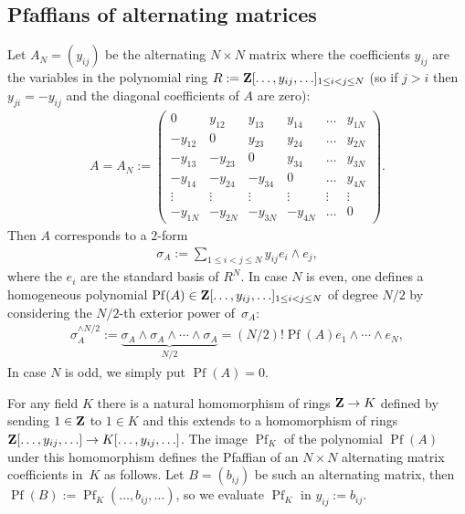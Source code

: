 \documentclass[pdftex]{sigma}
\newcommand{\ZZ}{{\bf Z}}
\numberwithin{equation}{section}
\begin{document}
\subsection{Pfaffians of alternating matrices} \label{Pfaff}
Let $A_N=(y_{ij})$ be the alternating $N\times N$ matrix where the coefficients $y_{ij}$ are the variables in the polynomial ring $R:=\ZZ[\ldots,y_{ij},\ldots]_{1\leq i<j\leq N}$
(so if $j>i$ then $y_{ji}=-y_{ij}$ and the diagonal coefficients of $A$ are zero):
\begin{gather*}
A = A_N :=\left(\begin{matrix}
0&y_{12}&y_{13}&y_{14}&\ldots&y_{1N}\\
-y_{12}&0&y_{23}&y_{24}&\ldots&y_{2N}\\
-y_{13}&-y_{23}&0&y_{34}&\ldots&y_{3N}\\
-y_{14}&-y_{24}&-y_{34}&0&\ldots&y_{4N}\\
\vdots&\vdots&\vdots&\vdots&\vdots&\vdots\\
-y_{1N}&-y_{2N}&-y_{3N}&-y_{4N}&\ldots&0
\end{matrix}\right).
\end{gather*}
Then $A$ corresponds to a $2$-form
\begin{gather*}
\sigma_A := \sum_{1\leq i<j\leq N} y_{ij}e_i\wedge e_j,
\end{gather*}
where the $e_i$ are the standard basis of $R^N$. In case $N$ is even, one defines a homogeneous polynomial $\operatorname{Pf}(A) \in \ZZ[\ldots,y_{ij},\ldots]_{1\leq i<j\leq N}$ of degree $N/2$ by considering the $N/2$-th exterior power of~$\sigma_A$:
\begin{gather*}
\sigma_A^{\wedge N/2} := \underbrace{\sigma_A\wedge\sigma_A\wedge \cdots\wedge\sigma_A}_{N/2} = {(N/2)!}\operatorname{Pf}(A)e_1\wedge\cdots\wedge e_N,
\end{gather*}
In case $N$ is odd, we simply put $\operatorname{Pf}(A)=0$.

For any field $K$ there is a natural homomorphism of rings $\ZZ\rightarrow K$ defined by sending $1\in\ZZ$ to $1\in K$ and this extends to a homomorphism of rings $\ZZ[\ldots,y_{ij},\ldots]\rightarrow K[\ldots,y_{ij},\ldots]$. The image $\operatorname{Pf}_K$ of the polynomial $\operatorname{Pf}(A)$ under this homomorphism defines the Pfaffian of an $N\times N$ alternating matrix coefficients in~$K$ as follows. Let $B=(b_{ij})$ be such an alternating matrix, then $\operatorname{Pf}(B):=\operatorname{Pf}_K(\ldots,b_{ij},\ldots)$, so we
evaluate $\operatorname{Pf}_K$ in $y_{ij}:=b_{ij}$.
\end{document}
